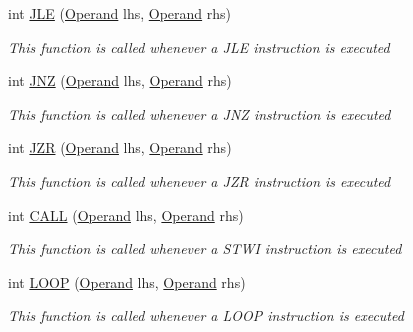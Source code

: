 \begin{DoxyCompactItemize}
int \hyperlink{class_c_p_u___o_s___simulator_1_1_c_p_u_1_1_instruction_a690dc53588584331941ef12f3b106e58}{J\+L\+E} (\hyperlink{class_c_p_u___o_s___simulator_1_1_c_p_u_1_1_operand}{Operand} lhs, \hyperlink{class_c_p_u___o_s___simulator_1_1_c_p_u_1_1_operand}{Operand} rhs)
\begin{DoxyCompactList}\small\item\em This function is called whenever a J\+L\+E instruction is executed \end{DoxyCompactList}\item 
int \hyperlink{class_c_p_u___o_s___simulator_1_1_c_p_u_1_1_instruction_a8341a8a333961e2a3b05eb1f34eb081f}{J\+N\+Z} (\hyperlink{class_c_p_u___o_s___simulator_1_1_c_p_u_1_1_operand}{Operand} lhs, \hyperlink{class_c_p_u___o_s___simulator_1_1_c_p_u_1_1_operand}{Operand} rhs)
\begin{DoxyCompactList}\small\item\em This function is called whenever a J\+N\+Z instruction is executed \end{DoxyCompactList}\item 
int \hyperlink{class_c_p_u___o_s___simulator_1_1_c_p_u_1_1_instruction_a87b3f8c13535a2c595a9dafa4ba69435}{J\+Z\+R} (\hyperlink{class_c_p_u___o_s___simulator_1_1_c_p_u_1_1_operand}{Operand} lhs, \hyperlink{class_c_p_u___o_s___simulator_1_1_c_p_u_1_1_operand}{Operand} rhs)
\begin{DoxyCompactList}\small\item\em This function is called whenever a J\+Z\+R instruction is executed \end{DoxyCompactList}\item 
int \hyperlink{class_c_p_u___o_s___simulator_1_1_c_p_u_1_1_instruction_a4fd8579b9499063c8112f03b1b7f1652}{C\+A\+L\+L} (\hyperlink{class_c_p_u___o_s___simulator_1_1_c_p_u_1_1_operand}{Operand} lhs, \hyperlink{class_c_p_u___o_s___simulator_1_1_c_p_u_1_1_operand}{Operand} rhs)
\begin{DoxyCompactList}\small\item\em This function is called whenever a S\+T\+W\+I instruction is executed \end{DoxyCompactList}\item 
int \hyperlink{class_c_p_u___o_s___simulator_1_1_c_p_u_1_1_instruction_a5007bf4af18c98a8b2080c506c3d0b83}{L\+O\+O\+P} (\hyperlink{class_c_p_u___o_s___simulator_1_1_c_p_u_1_1_operand}{Operand} lhs, \hyperlink{class_c_p_u___o_s___simulator_1_1_c_p_u_1_1_operand}{Operand} rhs)
\begin{DoxyCompactList}\small\item\em This function is called whenever a L\+O\+O\+P instruction is executed \end{DoxyCompactList}\item 

\end{DoxyCompactItemize}
